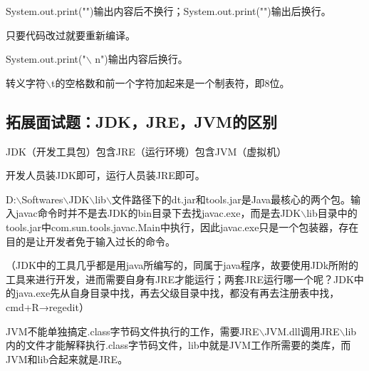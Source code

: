 \documentclass{article}
\begin{document}
		System.out.print("")输出内容后不换行；System.out.print("")输出后换行。
		
		只要代码改过就要重新编译。
		
		System.out.print("$\backslash$ n")输出内容后换行。
		
		转义字符$\backslash$t的空格数和前一个字符加起来是一个制表符，即8位。
		
		\subsection{拓展面试题：JDK，JRE，JVM的区别}
		
		JDK（开发工具包）包含JRE（运行环境）包含JVM（虚拟机）
		
		开发人员装JDK即可，运行人员装JRE即可。
		
		D:$\backslash$Softwares$\backslash$JDK$\backslash$lib$\backslash$文件路径下的dt.jar和tools.jar是Java最核心的两个包。输入javac命令时并不是去JDK的bin目录下去找javac.exe，而是去JDK$\backslash$lib目录中的tools.jar中com.sun.tools.javac.Main中执行，因此javac.exe只是一个包装器，存在目的是让开发者免于输入过长的命令。
		
		（JDK中的工具几乎都是用java所编写的，同属于java程序，故要使用JDk所附的工具来进行开发，进而需要自身有JRE才能运行；两套JRE运行哪一个呢？JDK中的java.exe先从自身目录中找，再去父级目录中找，都没有再去注册表中找，cmd+R→regedit）
		
		\bigskip
		
		JVM不能单独搞定.class字节码文件执行的工作，需要JRE$\backslash$JVM.dll调用JRE$\backslash$lib内的文件才能解释执行.class字节码文件，lib中就是JVM工作所需要的类库，而JVM和lib合起来就是JRE。
		
		
		
		
		
		
		
		
		
		
		
		
		
		
		
		
		
		
		
		
		
		
		
		
		
		
		
		
		
		
		
		
		
		
		
		
		
		
		
		
		
	
	
	
	
\end{document}
